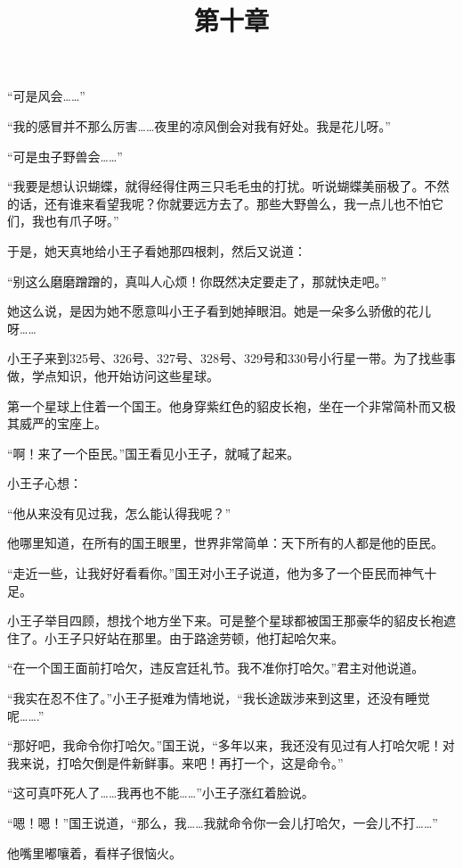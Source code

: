 “可是风会\ldots{}\ldots{}”

“我的感冒并不那么厉害\ldots{}\ldots{}夜里的凉风倒会对我有好处。我是花儿呀。”

“可是虫子野兽会\ldots{}\ldots{}”

“我要是想认识蝴蝶，就得经得住两三只毛毛虫的打扰。听说蝴蝶美丽极了。不然的话，还有谁来看望我呢？你就要远方去了。那些大野兽么，我一点儿也不怕它们，我也有爪子呀。”

于是，她天真地给小王子看她那四根刺，然后又说道：

“别这么磨磨蹭蹭的，真叫人心烦！你既然决定要走了，那就快走吧。”

她这么说，是因为她不愿意叫小王子看到她掉眼泪。她是一朵多么骄傲的花儿呀\ldots{}\ldots{}

\title{第十章}

小王子来到325号、326号、327号、328号、329号和330号小行星一带。为了找些事做，学点知识，他开始访问这些星球。

第一个星球上住着一个国王。他身穿紫红色的貂皮长袍，坐在一个非常简朴而又极其威严的宝座上。

{\startalignment[center]
 \stopalignment}

“啊！来了一个臣民。”国王看见小王子，就喊了起来。

小王子心想：

“他从来没有见过我，怎么能认得我呢？”

他哪里知道，在所有的国王眼里，世界非常简单：天下所有的人都是他的臣民。

“走近一些，让我好好看看你。”国王对小王子说道，他为多了一个臣民而神气十足。

小王子举目四顾，想找个地方坐下来。可是整个星球都被国王那豪华的貂皮长袍遮住了。小王子只好站在那里。由于路途劳顿，他打起哈欠来。

“在一个国王面前打哈欠，违反宫廷礼节。我不准你打哈欠。”君主对他说道。

“我实在忍不住了。”小王子挺难为情地说，“我长途跋涉来到这里，还没有睡觉呢\ldots{}\ldots{}.”

“那好吧，我命令你打哈欠。”国王说，“多年以来，我还没有见过有人打哈欠呢！对我来说，打哈欠倒是件新鲜事。来吧！再打一个，这是命令。”

“这可真吓死人了\ldots{}\ldots{}我再也不能\ldots{}\ldots{}”小王子涨红着脸说。

“嗯！嗯！”国王说道，“那么，我\ldots{}\ldots{}我就命令你一会儿打哈欠，一会儿不打\ldots{}\ldots{}”

他嘴里嘟嚷着，看样子很恼火。


